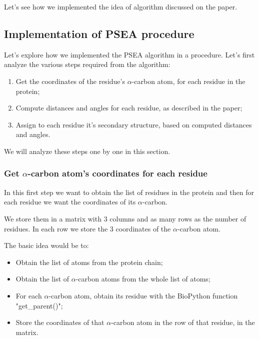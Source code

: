 Let's see how we implemented the idea of algorithm discussed on the paper\cite{psea}.

\pagebreak

\subsection{Implementation of PSEA procedure}
Let's explore how we implemented the PSEA algorithm in a procedure.
Let's first analyze the various steps required from the algorithm:
\begin{enumerate}
    \item Get the coordinates of the residue's $\alpha$-carbon atom, for each residue in the protein;
    \item Compute distances and angles for each residue, as described in the paper;
    \item Assign to each residue it's secondary structure, based on computed distances and angles.
\end{enumerate}
We will analyze these steps one by one in this section.

\subsubsection{Get $\alpha$-carbon atom's coordinates for each residue}
In this first step we want to obtain the list of residues in the protein and then for each residue we want the coordinates of its $\alpha$-carbon.

We store them in a matrix with 3 columns and as many rows as the number of residues. In each row we store the 3 coordinates of the $\alpha$-carbon atom.

The basic idea would be to:
\begin{itemize}
    \item Obtain the list of atoms from the protein chain; 
    \item Obtain the list of $\alpha$-carbon atoms from the whole list of atoms;
    \item For each $\alpha$-carbon atom, obtain its residue with the BioPython function "get\_parent()";
    \item Store the coordinates of that $\alpha$-carbon atom in the row of that residue, in the matrix.
\end{itemize}

